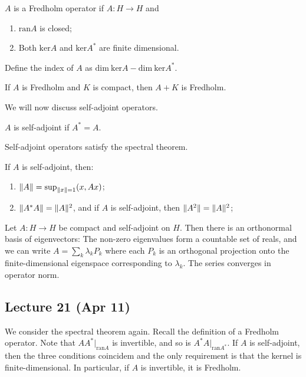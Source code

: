 \documentclass[10pt, twoside]{article}
\begin{document}
    \begin{defn}
        $A$ is a Fredholm operator if $A:H \to H$ and
        \begin{enumerate}
            \item $\mathrm{ran}A$ is closed;
            \item Both $\mathrm{ker}A$ and $\mathrm{ker}A^*$ are finite dimensional.
        \end{enumerate}
        Define the index of $A$ as $\mathrm{dim}\ \mathrm{ker} A - \mathrm{dim}\ \mathrm{ker}A^*$.
    \end{defn}

    \begin{prop}
        If $A$ is Fredholm and $K$ is compact, then $A+K$ is Fredholm.
    \end{prop}

    We will now discuss self-adjoint operators.
    \begin{defn}
        $A$ is self-adjoint if $A^* = A$.
    \end{defn}
    Self-adjoint operators satisfy the spectral theorem.

    \begin{lem}
        If $A$ is self-adjoint, then:
        \begin{enumerate}
        \item $\lVert A\rVert = \sup_{\lVert x\rVert = 1} (x,Ax)$;
        \item $\lVert A^*A\rVert = \lVert A\rVert^2$, and if $A$ is self-adjoint, then $\lVert A^2\rVert = \lVert A\rVert^2$;
        \end{enumerate}
    \end{lem}

    \begin{thm}
        Let $A: H \to H$ be compact and self-adjoint on $H$. Then there is an orthonormal basis of eigenvectors: The non-zero eigenvalues form a countable set of reals, and we can write $A = \sum_k \lambda_k P_k$ where each $P_k$ is an orthogonal projection onto the finite-dimensional eigenspace corresponding to $\lambda_k$. The series converges in operator norm.
    \end{thm}

    \subsection{Lecture 21 (Apr 11)}
    We consider the spectral theorem again. Recall the definition of a Fredholm operator. Note that $AA^*|_{\mathrm{ran}A}$ is invertible, and so is $A^*A|_{\mathrm{ran}A^*}$. If $A$ is self-adjoint, then the three conditions coincidem and the only requirement is that the kernel is finite-dimensional. In particular, if $A$ is invertible, it is Fredholm.
\end{document}
